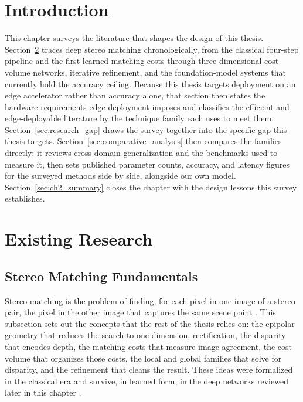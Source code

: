 \section{Introduction}
This chapter surveys the literature that shapes the design of this
thesis. Section~\ref{sec:existing_research} traces deep stereo matching
chronologically, from the classical four-step pipeline and the first
learned matching costs through three-dimensional cost-volume networks,
iterative refinement, and the foundation-model systems that currently
hold the accuracy ceiling. Because this thesis targets deployment on an
edge accelerator rather than accuracy alone, that section then states
the hardware requirements edge deployment imposes and classifies the
efficient and edge-deployable literature by the technique family each
uses to meet them. Section~\ref{sec:research_gap} draws the survey
together into the specific gap this thesis targets.
Section~\ref{sec:comparative_analysis} then compares the families
directly: it reviews cross-domain generalization and the benchmarks used
to measure it, then sets published parameter counts, accuracy, and
latency figures for the surveyed methods side by side, alongside our own
model. Section~\ref{sec:ch2_summary} closes the chapter with the design
lessons this survey establishes.

\FloatBarrier
\section{Existing Research}
\label{sec:existing_research}

\subsection{Stereo Matching Fundamentals}
Stereo matching is the problem of finding, for each pixel in one image of
a stereo pair, the pixel in the other image that captures the same scene
point \cite{scharstein2002taxonomy}. This subsection sets out the concepts
that the rest of the thesis relies on: the epipolar geometry that reduces
the search to one dimension, rectification, the disparity that encodes
depth, the matching costs that measure image agreement, the cost volume
that organizes those costs, the local and global families that solve for
disparity, and the refinement that cleans the result. These ideas were
formalized in the classical era \cite{scharstein2002taxonomy} and survive,
in learned form, in the deep networks reviewed later in this chapter
\cite{poggi2021synergies, laga2020survey}.

